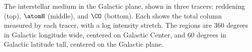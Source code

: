 The interstellar medium in the Galactic plane, shown in three tracers: reddening (top), $\atomH$ (middle), and $\CO$ (bottom). Each shows the total column measured by each tracer, with a log intensity stretch. The regions are 360 degrees in Galactic longitude wide, centered on Galactic Center, and 60 degrees in Galactic latitude tall, centered on the Galactic plane.  
